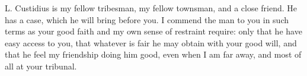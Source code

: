 

L. Custidius is my fellow tribesman, my fellow townsman, and a close friend. He has a case, which he will bring before you. I commend the man to you in such terms as your good faith and my own sense of restraint require: only that he have easy access to you, that whatever is fair he may obtain with your good will, and that he feel my friendship doing him good, even when I am far away, and most of all at your tribunal.
